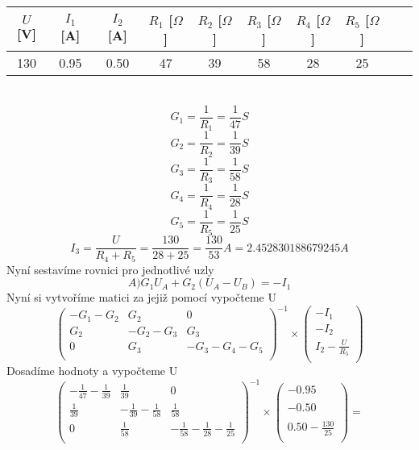\documentclass{article}
\begin{document}
\begin{tabular}{| c | c | c | c | c | c | c | c | c | c |}
  \hline
   $U$[V] & $I_1$ [A] & $I_2$ [A]& $R_{1}$ [$\Omega$]& $R_{2}$ [$\Omega$]& $R_{3}$ [$\Omega$]& $R_{4}$ [$\Omega$]& $R_{5}$ [$\Omega$]\\
  \hline
130 & 0.95 & 0.50 & 47 & 39 & 58 & 28 & 25\\
  \hline
\end{tabular}\\
\[
  G_1 = \displaystyle\frac{1}{R_1}
  = \displaystyle\frac{1}{47}S
\]
\[
  G_2 = \displaystyle\frac{1}{R_2}
  = \displaystyle\frac{1}{39}S
\]
\[
  G_3 = \displaystyle\frac{1}{R_3}
  = \displaystyle\frac{1}{58}S
\]
\[
  G_4 = \displaystyle\frac{1}{R_4}
  = \displaystyle\frac{1}{28}S
\]
\[
  G_5 = \displaystyle\frac{1}{R_5}
  = \displaystyle\frac{1}{25}S
\]
\[
  I_3 = \displaystyle\frac{U}{R_4 + R_5}
  = \displaystyle\frac{130}{28 + 25}
  = \displaystyle\frac{130}{53}A
  = 2.452830188679245A
\]
 Nyní sestavíme rovnici pro jednotlivé uzly
 \[
   A)G_1 U_A + G_2 (U_A - U_B ) = -I_1
 \]
 Nyní si vytvoříme matici za jejiž pomocí vypočteme U
\[
  \begin{pmatrix}
    -G_1-G_2 & G_2 & 0\\
    G_2 & -G_2-G_3 & G_3\\
    0 & G_3 & -G_3-G_4-G_5\\
  \end{pmatrix}^{-1}
  \times
  \begin{pmatrix}
    -I_1\\
    -I_2\\
    I_2-\displaystyle\frac{U}{R_5}\\
  \end{pmatrix}
\]
Dosadíme hodnoty a vypočteme U\\
\[
  \begin{pmatrix}
    -\displaystyle\frac{1}{47} -\displaystyle\frac{1}{39} & \displaystyle\frac{1}{39} & 0\\
    \displaystyle\frac{1}{39} & -\displaystyle\frac{1}{39}-\displaystyle\frac{1}{58} & \displaystyle\frac{1}{58}\\
    0 & \displaystyle\frac{1}{58} & -\displaystyle\frac{1}{58}-\displaystyle\frac{1}{28}-\displaystyle\frac{1}{25}\\
  \end{pmatrix}^{-1}
  \times
  \begin{pmatrix}
    -0.95\\
    \\
    -0.50\\
    \\
    0.50-\displaystyle\frac{130}{25}\\
    
  \end{pmatrix}
  =
\]
\end{document}
